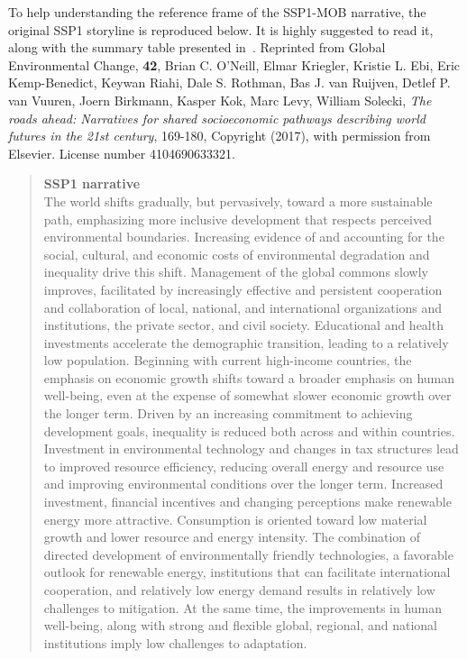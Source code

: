 To help understanding the reference frame of the SSP1-MOB narrative, the original SSP1 storyline is reproduced below. It is highly suggested to read it, along with the summary table presented in~. Reprinted from Global Environmental Change, \textbf{42}, Brian C. O’Neill, Elmar Kriegler, Kristie L. Ebi, Eric Kemp-Benedict, Keywan Riahi, Dale S. Rothman, Bas J. van Ruijven, Detlef P. van Vuuren, Joern Birkmann, Kasper Kok, Marc
Levy, William Solecki, \textit{The roads ahead: Narratives for shared socioeconomic pathways describing world futures in the 21st century}, 169-180, Copyright (2017), with permission from Elsevier. License number 4104690633321.
%
\blockquote{\sffamily \textbf{SSP1 narrative}\\The world shifts gradually, but pervasively, toward a more sustainable path, emphasizing more inclusive development that respects perceived environmental boundaries. Increasing evidence of and accounting for the social, cultural, and economic costs of environmental degradation and inequality drive this shift. Management of the global commons slowly improves, facilitated by increasingly effective and persistent cooperation and collaboration of local, national, and international organizations and institutions, the private sector, and civil society. Educational and health investments accelerate the demographic transition, leading to a relatively low population. Beginning with current high-income countries, the emphasis on economic growth shifts toward a broader emphasis on human well-being, even at the expense of somewhat slower economic growth over the longer term. Driven by an increasing commitment to achieving development goals, inequality is reduced both across and within countries. Investment in environmental technology and changes in tax structures lead to improved resource efficiency, reducing overall energy and resource use and improving environmental conditions over the longer term. Increased investment, financial incentives and changing perceptions make renewable energy more attractive. Consumption is oriented toward low material growth and lower resource and energy intensity. The combination of directed development of environmentally friendly technologies, a favorable outlook for renewable energy, institutions that can facilitate international cooperation, and relatively low energy demand results in relatively low challenges to mitigation. At the same time, the improvements in human well-being, along with strong and flexible global, regional, and national institutions imply low challenges to adaptation.
}

